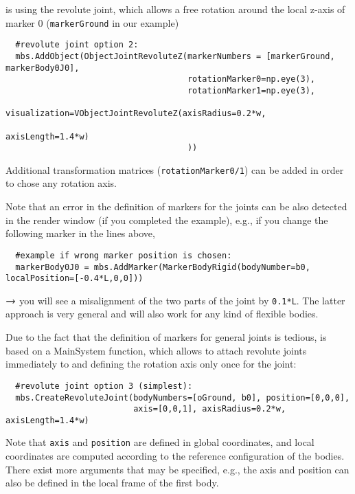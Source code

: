\noindent {} is using the revolute joint, which allows a free rotation around the local z-axis of marker 0 (\texttt{markerGround} in our example)
\pythonstyle\begin{lstlisting}
  #revolute joint option 2:
  mbs.AddObject(ObjectJointRevoluteZ(markerNumbers = [markerGround, markerBody0J0], 
                                     rotationMarker0=np.eye(3),
                                     rotationMarker1=np.eye(3),
                                     visualization=VObjectJointRevoluteZ(axisRadius=0.2*w, 
                                                                         axisLength=1.4*w)
                                     )) 
\end{lstlisting}
Additional transformation matrices (\texttt{rotationMarker0/1}) can be added in order to chose any rotation axis.

\noindent Note that an error in the definition of markers for the joints can be also detected in the render window (if you completed the example), e.g., if you change the following marker in the lines above,
\pythonstyle\begin{lstlisting}
  #example if wrong marker position is chosen:
  markerBody0J0 = mbs.AddMarker(MarkerBodyRigid(bodyNumber=b0, localPosition=[-0.4*L,0,0]))
\end{lstlisting}
$\rightarrow$ you will see a misalignment of the two parts of the joint by \texttt{0.1*L}.
The latter approach is very general and will also work for any kind of flexible bodies.

\noindent Due to the fact that the definition of markers for general joints is tedious,  is based on a MainSystem function, which allows to attach revolute joints immediately to  and defining the rotation axis only once for the joint:
\pythonstyle\begin{lstlisting}
  #revolute joint option 3 (simplest):
  mbs.CreateRevoluteJoint(bodyNumbers=[oGround, b0], position=[0,0,0], 
                          axis=[0,0,1], axisRadius=0.2*w, axisLength=1.4*w)
\end{lstlisting}
Note that \texttt{axis} and \texttt{position} are defined in global coordinates, and local coordinates are computed according to the
reference configuration of the bodies.
There exist more arguments that may be specified, e.g., the axis and position can also be defined in the local frame of the first body.

